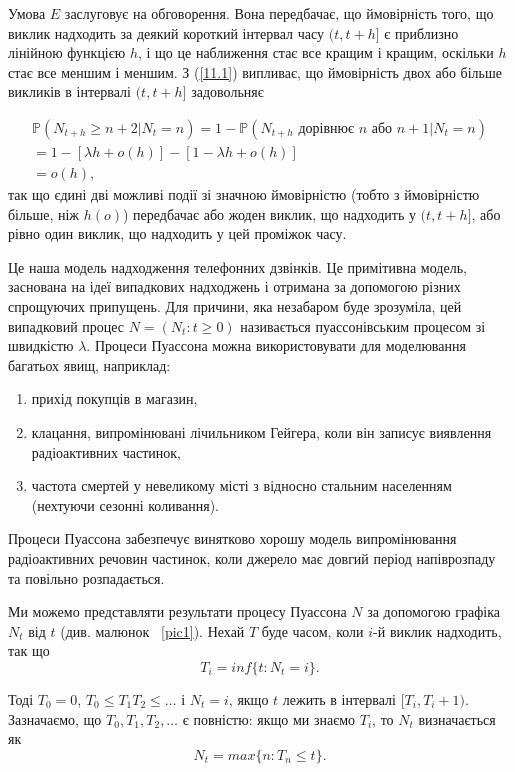 \documentclass[12pt,fleqn]{article}
\numberwithin{figure}{section}
\numberwithin{equation}{section}
\begin{document}
Умова $E$ заслуговує на обговорення. Вона передбачає, що ймовірність того, що виклик надходить за деякий короткий інтервал часу $(t,t+h]$ є приблизно лінійною функцією $h$, і що це наближення стає все кращим і кращим, оскільки $h$ стає все меншим і меншим. З (\ref{11.1}) випливає, що ймовірність двох або більше викликів в інтервалі $(t,t+h]$ задовольняє


\begin{gather*}
    \mathbb{P}(N_{t+h}\geq n+2\big|N_t=n)=1-\mathbb{P}(N_{t+h} \text{ дорівнює } n \text{ або } n+1\big|N_t=n)\\
    =1-[\lambda h+o(h)]-[1-\lambda h+o(h)]\\
    =o(h),
\end{gather*}
так що єдині дві можливі події зі значною ймовірністю (тобто з ймовірністю більше, ніж $h(o)$) передбачає або жоден виклик, що надходить у $(t,t+h]$, або рівно один виклик, що надходить у цей проміжок часу.

Це наша модель надходження телефонних дзвінків. Це примітивна модель, заснована на ідеї випадкових надходжень і отримана за допомогою різних спрощуючих припущень. Для причини, яка незабаром буде зрозуміла, цей випадковий процес $N=(N_t:t\geq 0)$ називається пуассонівським процесом зі швидкістю $\lambda$. Процеси Пуассона можна використовувати для моделювання багатьох явищ, наприклад:
\begin{enumerate}
  \item прихід покупців в магазин,
  \item клацання, випромінювані лічильником Гейгера, коли він записує виявлення радіоактивних частинок,
  \item частота смертей у невеликому місті з відносно стальним населенням (нехтуючи сезонні коливання).
\end{enumerate}

Процеси Пуассона забезпечує винятково хорошу модель випромінювання радіоактивних речовин частинок, коли джерело має довгий період напіврозпаду та повільно розпадається.

Ми можемо представляти результати процесу Пуассона $N$ за допомогою графіка $N_t$ від $t$ (див. малюнок ~\ref{pic1}). Нехай $T$ буде часом, коли $i$-й виклик надходить, так що
\begin{equation}\label{11.2}
  T_i=inf\{t:N_t=i\}.
\end{equation}

Тоді $T_0=0$, $T_0\leq T_1 T_2\leq \dots$ і $N_t=i$, якщо $t$ лежить в інтервалі $[T_i, T_i+1)$. Зазначаємо, що $T_0, T_1, T_2, \dots$ є повністю: якщо ми знаємо $T_i$, то $N_t$ визначається як
\[N_t=max\{n:T_n\leq t\}.\]
\end{document}
